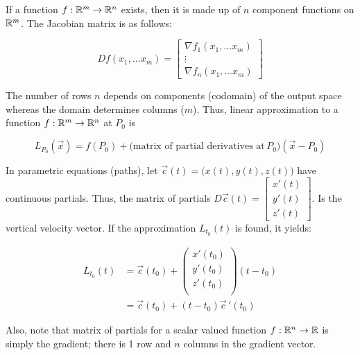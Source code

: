 If a function $f:\mathbb{R}^m\to \mathbb{R}^n$ exists, then it is made up of $n$ component functions on $\mathbb{R}^m$. The Jacobian matrix is as follows:

\[Df\left( x_1,\ldots x_m\right) =\begin{bmatrix} \nabla f_{1}\left(x_1,\ldots x_m\right) \\ \vdots \\ \nabla f_{n}\left(x_1,\ldots x_m\right) \end{bmatrix}\]

The number of rows $n$ depends on components (codomain) of the output space whereas the domain determines columns ($m$). Thus, linear approximation to a function $f:\mathbb{R}^m\to \mathbb{R}^n$ at $P_0$ is

\[L_{P_0}(\vec{x})=f(P_0)+\Big(\mbox{matrix of partial derivatives at}\,P_0\Big)(\vec{x}-P_0)\]

In parametric equations (paths), let $\vec{c}(t)=\big(x(t), y(t), z(t) \big)$ have continuous partials.
Thus, the matrix of partials $D\vec c(t)=\begin{bmatrix}x'(t)\\y'(t)\\z'(t)\end{bmatrix}$. Is the vertical velocity vector.
If the approximation $L_{t_0}(t)$ is found, it yields:

\begin{align*}
    L_{t_0}(t)&=\vec c(t_0)+
    \left(
    \begin{matrix}
    x'(t_0)\\
    y'(t_0)\\
    z'(t_0)\\
    \end{matrix}
    \right)
    (t-t_0)\\
    &=\vec{c} (t_0)+(t-t_0)\vec c\,'(t_0)
\end{align*}

Also, note that matrix of partials for a scalar valued function $f:\mathbb{R}^n\to \mathbb{R}$ is simply the gradient; there is 1 row and $n$ columns in the gradient vector.